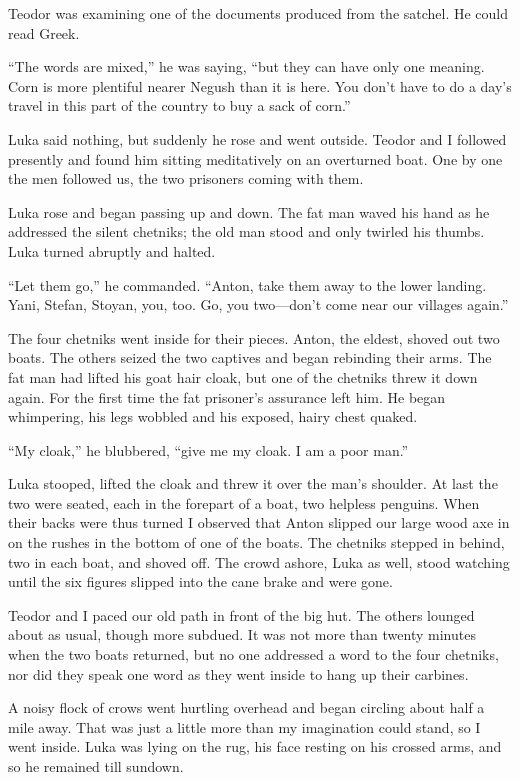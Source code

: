 \documentclass[a5paper,12pt]{book}
\begin{document}
Teodor was examining one of the documents produced from the satchel. He could read Greek. 

“The words are mixed,” he was saying, “but they can have only one meaning. Corn is more plentiful nearer Negush than it is here. You don’t have to do a day’s travel in this part of the country to buy a sack of corn.” 

Luka said nothing, but suddenly he rose and went outside. Teodor and I followed presently and found him sitting meditatively on an overturned boat. One by one the men followed us, the two prisoners coming with them. 

Luka rose and began passing up and down. The fat man waved his hand as he addressed the silent chetniks; the old man stood and only twirled his thumbs. Luka turned abruptly and halted. 

“Let them go,” he commanded. “Anton, take them away to the lower landing. Yani, Stefan, Stoyan, you, too. Go, you two—don’t come near our villages again.” 

The four chetniks went inside for their pieces. Anton, the eldest, shoved out two boats. The others seized the two captives and began rebinding their arms. The fat man had lifted his goat hair cloak, but one of the chetniks threw it down again. For the first time the fat prisoner’s assurance left him. He began whimpering, his legs wobbled and his exposed, hairy chest quaked. 

“My cloak,” he blubbered, “give me my cloak. I am a poor man.” 

Luka stooped, lifted the cloak and threw it over the man’s shoulder.
At last the two were seated, each in the forepart of a boat, two helpless penguins. When their backs were thus turned I observed that Anton slipped our large wood axe in on the rushes in the bottom of one of the boats. The chetniks stepped in behind, two in each boat, and shoved off. The crowd ashore, Luka as well, stood watching until the six figures slipped into the cane brake and were gone. 

Teodor and I paced our old path in front of the big hut. The others lounged about as usual, though more subdued. It was not more than twenty minutes when the two boats returned, but no one addressed a word to the four chetniks, nor did they speak one word as they went inside to hang up their carbines. 

A noisy flock of crows went hurtling overhead and began circling about half a mile away. That was just a little more than my imagination could stand, so I went inside. Luka was lying on the rug, his face resting on his crossed arms, and so he remained till sundown.
\end{document}

